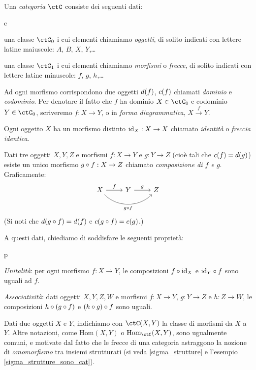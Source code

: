 \begin{definition}[Categoria]
 Una \emph{categoria} $\ctC$ consiste dei seguenti dati:
 \begin{enumtag}{c}
  \item\label{c_1} una classe $\ctC_0$ i cui elementi chiamiamo \emph{oggetti}, di solito indicati con lettere latine maiuscole: $A$, $B$, $X$, $Y$,\dots
  \item\label{c_2} una classe $\ctC_1$ i cui elementi chiamiamo \emph{morfismi} o \emph{frecce}, di solito indicati con lettere latine minuscole: $f$, $g$, $h$,\dots
  \item\label{c_3} Ad ogni morfismo corrispondono due oggetti $d(f)$, $c(f)$ chiamati \emph{dominio} e \emph{codominio}. Per denotare il fatto che $f$ ha dominio $X\in\ctC_0$ e codominio $Y\in\ctC_0$, scriveremo $f:X\to Y$, o in \emph{forma diagrammatica}, $X \xrightarrow{f} Y$.
  \item\label{c_4} Ogni oggetto $X$ ha un morfismo distinto $\mathrm{id}_X:X\to X$ chiamato \emph{identità} o \emph{freccia identica}.
  \item\label{c_5} Dati tre oggetti $X,Y,Z$ e morfismi $f:X\to Y$ e $g:Y\to Z$ (cioè tali che $c(f)=d(g)$) esiste un unico morfismo $g\circ f:X\to Z$ chiamato \emph{composizione di $f$ e $g$}. Graficamente:
  \[
  \begin{tikzcd}
   X \ar{r}{f}
   \ar[rounded corners,out=-45, in=225]{rr}[swap]{g\cmp f}
   & Y \ar{r}{g} & Z \\
   &&
  \end{tikzcd}
  \]
  (Si noti che $d(g\circ f)=d(f)$ e $c(g\circ f)=c(g)$.)
\end{enumtag}
  A questi dati, chiediamo di soddisfare le seguenti proprietà:
\begin{enumtag}{p}
  \item \label{p_1} \emph{Unitalità}: per ogni morfismo $f:X\to Y$, le composizioni $f\circ\mathrm{id}_X$ e $\mathrm{id}_Y\circ f$ sono uguali ad $f$.
  \item \label{p_2} \emph{Associatività}: dati oggetti $X,Y,Z,W$ e morfismi $f:X\to Y$, $g:Y\to Z$ e $h:Z\to W$, le composizioni $h\circ (g\circ f)$ e $(h\circ g)\circ f$ sono uguali.
 \end{enumtag}
\end{definition}
\begin{notation}
Dati due oggetti $X$ e $Y$, indichiamo con $\Hom{\ctC}(X,Y)$ la classe di morfismi da $X$ a $Y$. Altre notazioni, come $\mathrm{Hom}(X,Y)$ o $\mathrm{Hom}_\ctC(X,Y)$, sono ugualmente comuni, e motivate dal fatto che le frecce di una categoria astraggono la nozione di \emph{omomorfismo} tra insiemi strutturati (si veda \autoref{sigma_strutture} e l'esempio \autoref{sigma_strutture_sono_cat}).
\end{notation}
